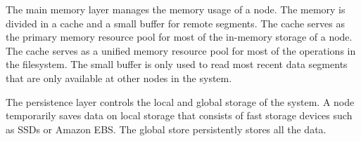 \documentclass[]{article}
\begin{document}
{The main memory layer manages the memory usage of a node. 
The memory is divided in a cache and a small buffer for remote segments.
The cache serves as the primary memory resource pool for most of the
in-memory storage of a node. The cache serves as a unified memory
resource pool for most of the operations in the filesystem. The small
buffer is only used to read most recent data segments that are only
available at other nodes in the system.


The persistence layer controls the local and global storage of the system.
A node temporarily saves data on local storage that consists of fast
storage devices such as SSDs or Amazon EBS. The global store persistently
stores all the data.


%
%
%
%
}
\end{document}
